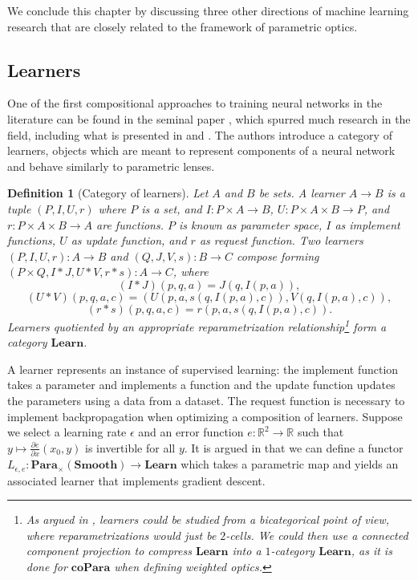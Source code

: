 \documentclass[11pt,a4paper,openright,twoside]{report}
\newcounter{mycounter}
\theoremstyle{plain}
\newtheorem{definition}[mycounter]{Definition}
\theoremstyle{definition}
\begin{document}
We conclude this chapter by discussing three other directions of machine learning research that are closely related to the framework of parametric optics.
  

\subsection{Learners}


One of the first compositional approaches to training neural networks in the literature can be found in the seminal paper \cite{fong2019backprop}, which spurred much research in the field, including what is presented in \cite{gavranovic2024fundamental} and \cite{cruttwell2022categorical}. The authors introduce a category of learners, objects which are meant to represent components of a neural network and behave similarly to parametric lenses. 


\begin{definition}[Category of learners]
  Let $A$ and $B$ be sets. A learner $A \to B$ is a tuple $(P, I, U, r)$ where $P$ is a set, and $I: P \times A \to B$, $U: P \times A \times B \to P$, and $r: P \times A \times B \to A$ are functions.
  $P$ is known as parameter space, $I$ as implement functions, $U$ as update function, and $r$ as request function. Two learners $(P, I, U, r): A \to B$ and $(Q, J, V, s): B \to C$ compose forming $(P \times Q, I \ast J, U \ast V, r \ast s ): A \to C$, where
  \[(I \ast J)(p,q,a) = J(q,I(p,a)),\]
  \[(U \ast V)(p,q,a,c) = (U(p,a,s(q,I(p,a),c)), V(q,I(p,a),c)),\]
  \[(r \ast s)(p,q,a,c) = r(p,a,s(q,I(p,a),c)).\]
  Learners quotiented by an appropriate reparametrization relationship\footnote{As argued in \cite{fong2019backprop}, learners could be studied from a bicategorical point of view, where reparametrizations would just be $2$-cells. We could then use a connected component projection to compress $\mathbf{Learn}$ into a $1$-category $\mathbf{Learn}$, as it is done for $\mathbf{coPara}$ when defining weighted optics.} form a category $\mathbf{Learn}$.
\end{definition}

A learner represents an instance of supervised learning: the implement function takes a parameter and implements a function and the update function updates the parameters using a data from a dataset. The request function is necessary to implement backpropagation when optimizing a composition of learners. Suppose we select a learning rate $\epsilon$ and an error function $e: \mathbb{R}^2 \to \mathbb{R}$ such that $y \mapsto \frac{\partial e }{\partial x}(x_0, y)$ is invertible for all $y$. It is argued in \cite{fong2019backprop} that we can define a functor $L_{\epsilon, e}: \mathbf{Para}_{\times}(\mathbf{Smooth}) \to \mathbf{Learn}$ which takes a parametric map and yields an associated learner that implements gradient descent. 
\end{document}
